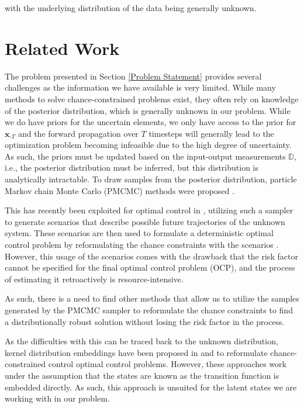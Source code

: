 with the underlying distribution of the data being generally unknown.

\section{Related Work} \label{Related Work}


The problem presented in Section \ref{Problem Statement} provides several challenges as the information we have available is very limited. While many methods to solve chance-constrained problems exist, they often rely on knowledge of the posterior distribution, which is generally unknown in our problem. While we do have priors for the uncertain elements, we only have access to the prior for $\boldsymbol{x}_{\text{-}T}$ and the forward propagation over $T$ timesteps will generally lead to the optimization problem becoming infeasible due to the high degree of uncertainty. As such, the priors must be updated based on the input-output measurements $\mathbb{D}$, i.e., the posterior distribution must be inferred, but this distribution is analytically intractable. To draw samples from the posterior distribution, particle Markov chain Monte Carlo (PMCMC) methods were proposed \cite{Andrieu_10}. 

This has recently been exploited for optimal control in \cite{Robert_24}, utilizing such a sampler to generate scenarios that describe possible future trajectories of the unknown system. These scenarios are then used to formulate a deterministic optimal control problem by reformulating the chance constraints with the scenarios \cite{Garatti_22}. However, this usage of the scenarios comes with the drawback that the risk factor cannot be specified for the final optimal control problem (OCP), and the process of estimating it retroactively is resource-intensive.

As such, there is a need to find other methods that allow us to utilize the samples generated by the PMCMC sampler to reformulate the chance constraints to find a distributionally robust solution without losing the risk factor in the process. 

As the difficulties with this can be traced back to the unknown distribution, kernel distribution embeddings have been proposed in \cite{Adam_21} and \cite{Adam_22} to reformulate chance-constrained control optimal control problems. However, these approaches work under the assumption that the states are known as the transition function is embedded directly. As such, this approach is unsuited for the latent states we are working with in our problem.

